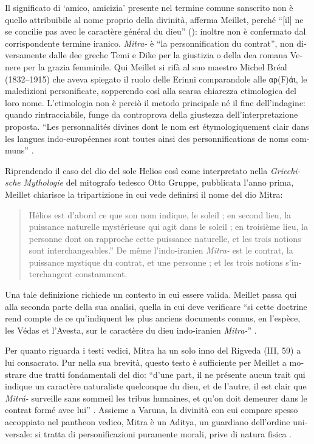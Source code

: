 \documentclass[output=paper]{../langscibook}
\begin{document}
\begin{otherlanguage}{italian}
Il significato di ‘amico, amicizia’ presente nel termine comune sanscrito non è quello attribuibile al nome proprio della divinità, afferma Meillet, perché “[il] ne se concilie pas avec le caractère général du dieu” (\citealt[145]{meillet_dieu_1907-1}): inoltre non è confermato dal corrispondente termine iranico. \textit{Mitra-} è “la personnification du contrat”, non diversamente dalle dee greche Temi e Dike per la giustizia o della dea romana Venere per la grazia femminile. Qui Meillet si rifà al suo maestro Michel Bréal (1832--1915) che aveva spiegato il ruolo delle Erinni comparandole alle αρ(Ϝ)άι, le maledizioni personificate, sopperendo così alla scarsa chiarezza etimologica del loro nome. L’etimologia non è perciò il metodo principale né il fine dell’indagine: quando rintracciabile, funge da controprova della giustezza dell’interpretazione proposta. “Les personnalités divines dont le nom est étymologiquement clair dans les langues indo-européennes sont toutes ainsi des personnifications de noms communs” \citep[145--146]{meillet_dieu_1907-1}.

Riprendendo il caso del dio del sole Helios così come interpretato nella \textit{Griechische} \textit{Mythologie} del mitografo tedesco Otto Gruppe, pubblicata l’anno prima, Meillet chiarisce la tripartizione in cui vede definirsi il nome del dio Mitra: 

\begin{quote}
    Hélios est d’abord ce que son nom indique, le soleil ; en second lieu, la puissance naturelle mystérieuse qui agit dans le soleil ; en troisième lieu, la personne dont on rapproche cette puissance naturelle, et les trois notions sont interchangeables.” De même l’indo-iranien \textit{Mitra-} est le contrat, la puissance mystique du contrat, et une personne ; et les trois notions s’interchangent constamment. \citep[146]{meillet_dieu_1907-1}
\end{quote}

Una tale definizione richiede un contesto in cui essere valida. Meillet passa qui alla seconda parte della sua analisi, quella in cui deve verificare “si cette doctrine rend compte de ce qu’indiquent les plus anciens documents connus, en l’espèce, les Védas et l’Avesta, sur le caractère du dieu indo-iranien \textit{Mitra-}” \citep[146]{meillet_dieu_1907-1}.

Per quanto riguarda i testi vedici, Mitra ha un solo inno del Rigveda (III, 59) a lui consacrato. Pur nella sua brevità, questo testo è sufficiente per Meillet a mostrare due tratti fondamentali del dio: “d’une part, il ne présente aucun trait qui indique un caractère naturaliste quelconque du dieu, et de l’autre, il est clair que \textit{Mitrá-} surveille sans sommeil les tribus humaines, et qu’on doit demeurer dans le contrat formé avec lui” \citep[147]{meillet_dieu_1907-1}. Assieme a Varuna, la divinità con cui compare spesso accoppiato nel pantheon vedico, Mitra è un Aditya, un guardiano dell’ordine universale: si tratta di personificazioni puramente morali, prive di natura fisica \citep[147]{meillet_dieu_1907-1}. 


\end{otherlanguage}
\end{document}
